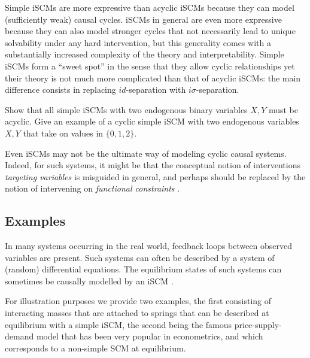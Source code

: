 Simple iSCMs are more expressive than acyclic iSCMs because they can model (sufficiently
weak) causal cycles. iSCMs in general are even more expressive because they can also
model stronger cycles that not necessarily lead to unique solvability under any hard
intervention, but this generality comes with a substantially increased complexity of
the theory and interpretability. Simple iSCMs form a ``sweet spot'' in the sense that they allow cyclic
relationships yet their theory is not much more complicated than that of acyclic iSCMs:
the main difference consists in replacing $id$-separation with $i\sigma$-separation.

\begin{Exc}
  Show that all simple iSCMs with two endogenous binary variables $X,Y$ must be acyclic.
  Give an example of a cyclic simple iSCM with two endogenous variables $X,Y$ that take on values in $\{0,1,2\}$.
\end{Exc}

Even iSCMs may not be the ultimate way of modeling cyclic causal systems. Indeed, for such
systems, it might be that the conceptual notion of interventions \emph{targeting variables} is misguided in general, 
and perhaps should be replaced by the notion of intervening on \emph{functional constraints} \cite{BlomVanDiepenMooij_JMLR_21}.

\subsection{Examples}\label{sec:scm_examples}

In many systems occurring in the real world, feedback loops between observed variables are present. 
Such systems can often be described by a system of (random) differential equations. 
The equilibrium states of such systems can sometimes be causally modelled by an iSCM \cite{BM18}.

For illustration purposes we provide two examples, the first consisting of interacting masses that are attached to springs
that can be described at equilibrium with a simple iSCM, the second being the famous price-supply-demand model that has been
very popular in econometrics, and which corresponds to a non-simple SCM at equilibrium.

